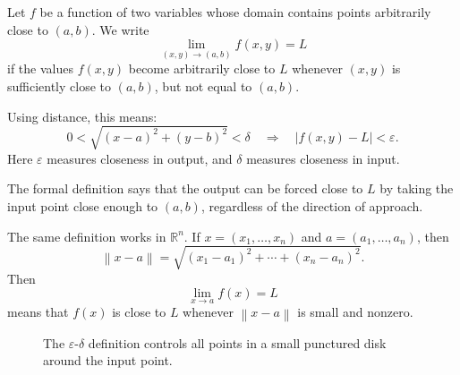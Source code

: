 \documentclass[11pt]{article}
\newcommand{\R}{\mathbb R}
\newcommand{\norm}[1]{\left\lVert #1\right\rVert}
\newcommand{\abs}[1]{\left\lvert #1\right\rvert}
\begin{document}
Let $f$ be a function of two variables whose domain contains points arbitrarily close to $(a,b)$. We write
\[
\lim_{(x,y)\to(a,b)} f(x,y)=L
\]
if the values $f(x,y)$ become arbitrarily close to $L$ whenever $(x,y)$ is sufficiently close to $(a,b)$, but not equal to $(a,b)$.

Using distance, this means:
\[
0<\sqrt{(x-a)^2+(y-b)^2}<\delta
\quad \Longrightarrow \quad
\abs{f(x,y)-L}<\varepsilon.
\]
Here $\varepsilon$ measures closeness in output, and $\delta$ measures closeness in input.

\begin{tipbox}
The formal definition says that the output can be forced close to $L$ by taking the input point close enough to $(a,b)$, regardless of the direction of approach.
\end{tipbox}

The same definition works in $\R^n$. If $x=(x_1,\ldots,x_n)$ and $a=(a_1,\ldots,a_n)$, then
\[
\norm{x-a}=\sqrt{(x_1-a_1)^2+\cdots+(x_n-a_n)^2}.
\]
Then
\[
\lim_{x\to a} f(x)=L
\]
means that $f(x)$ is close to $L$ whenever $\norm{x-a}$ is small and nonzero.

\begin{figure}[H]
\centering
{}
\caption{The $\varepsilon$-$\delta$ definition controls all points in a small punctured disk around the input point.}
\end{figure}
\end{document}

